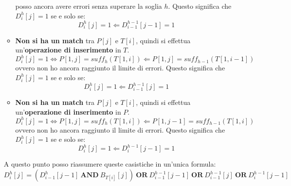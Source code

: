 \begin{itemize}
\begin{itemize}
                    posso ancora avere errori senza superare la soglia $h$.
                    Questo significa che $D_i^h[j] = 1$ se e solo se:
                    \begin{equation}
                        D_i^h[j] = 1 \Leftarrow D_{i - 1}^{h - 1} [j - 1] = 1
                    \end{equation}
              \item \textbf{Non si ha un match} tra $P[j]$ e $T[i]$, quindi si
                    effettua un'\textbf{operazione di inserimento} in $T$.
                    \begin{equation}
                        D_i^h[j] = 1 \iff P[1, j] = suff_h(T[1, i]) \Leftarrow
                        P[1, j] = suff_{h - 1}(T[1, i - 1])
                    \end{equation}
                    ovvero non ho ancora raggiunto il limite di errori. Questo
                    significa che $D_i^h[j] = 1$ se e solo se:
                    \begin{equation}
                        D_i^h[j] = 1 \Leftarrow D_{i - 1}^{h - 1} [j] = 1
                    \end{equation}
              \item \textbf{Non si ha un match} tra $P[j]$ e $T[i]$, quindi si
                    effettua un'\textbf{operazione di inserimento} in $P$.
                    \begin{equation}
                        D_i^h[j] = 1 \iff P[1, j] = suff_h(T[1, i]) \Leftarrow
                        P[1, j - 1] = suff_{h - 1}(T[1, i])
                    \end{equation}
                    ovvero non ho ancora raggiunto il limite di errori. Questo
                    significa che $D_i^h[j] = 1$ se e solo se:
                    \begin{equation}
                        D_i^h[j] = 1 \Leftarrow D_{i}^{h - 1} [j - 1] = 1
                    \end{equation}
          \end{itemize}
          A questo punto posso riassumere queste casistiche in un'unica formula:
          \begin{equation}
              D_{i}^{h} [j] =
              (D_{i - 1}^{h} [j - 1] \ \textbf{AND} \ B_{T[i]} [j]) \ \textbf{OR}
              \ D_{i - 1}^{h - 1} [j - 1] \ \textbf{OR}
              \ D_{i - 1}^{h - 1} [j] \ \textbf{OR}
              \ D_{i}^{h - 1} [j - 1]
          \end{equation}

\end{itemize}

